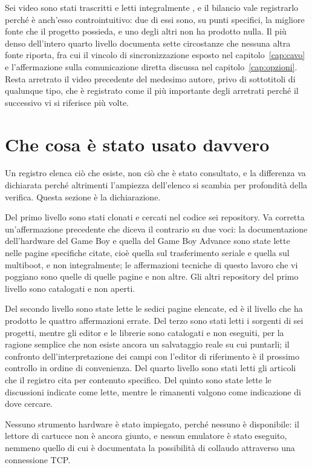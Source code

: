Sei video sono stati trascritti e letti integralmente \cite{video-goppier,video-trascritti}, e il bilancio vale registrarlo perché è anch'esso controintuitivo: due di essi sono, su punti specifici, la migliore fonte che il progetto possieda, e uno degli altri non ha prodotto nulla. Il più denso dell'intero quarto livello documenta sette circostanze che nessuna altra fonte riporta, fra cui il vincolo di sincronizzazione esposto nel capitolo~\ref{cap:cavo} e l'affermazione sulla comunicazione diretta discussa nel capitolo~\ref{cap:opzioni}. Resta arretrato il video precedente del medesimo autore, privo di sottotitoli di qualunque tipo, che è registrato come il più importante degli arretrati perché il successivo vi si riferisce più volte.

\section{Che cosa è stato usato davvero}

Un registro elenca ciò che esiste, non ciò che è stato consultato, e la differenza va dichiarata perché altrimenti l'ampiezza dell'elenco si scambia per profondità della verifica. Questa sezione è la dichiarazione.

Del primo livello sono stati clonati e cercati nel codice sei repository. Va corretta un'affermazione precedente che diceva il contrario su due voci: la documentazione dell'hardware del Game Boy e quella del Game Boy Advance sono state lette nelle pagine specifiche citate, cioè quella sul trasferimento seriale e quella sul multiboot, e non integralmente; le affermazioni tecniche di questo lavoro che vi poggiano sono quelle di quelle pagine e non altre. Gli altri repository del primo livello sono catalogati e non aperti.

Del secondo livello sono state lette le sedici pagine elencate, ed è il livello che ha prodotto le quattro affermazioni errate. Del terzo sono stati letti i sorgenti di sei progetti, mentre gli editor e le librerie sono catalogati e non eseguiti, per la ragione semplice che non esiste ancora un salvataggio reale su cui puntarli; il confronto dell'interpretazione dei campi con l'editor di riferimento è il prossimo controllo in ordine di convenienza. Del quarto livello sono stati letti gli articoli che il registro cita per contenuto specifico. Del quinto sono state lette le discussioni indicate come lette, mentre le rimanenti valgono come indicazione di dove cercare.

Nessuno strumento hardware è stato impiegato, perché nessuno è disponibile: il lettore di cartucce non è ancora giunto, e nessun emulatore è stato eseguito, nemmeno quello di cui è documentata la possibilità di collaudo attraverso una connessione TCP.



